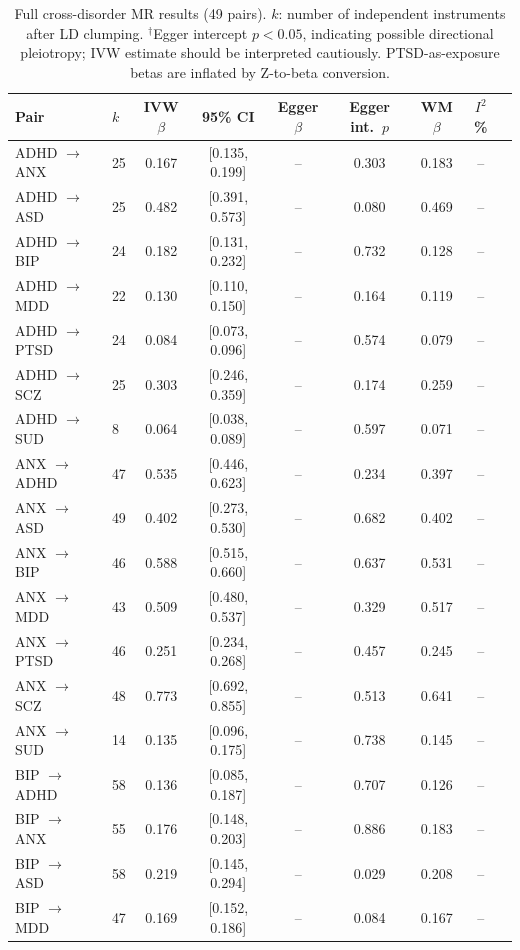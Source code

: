 \documentclass[11pt]{article}
\begin{document}
\begin{table}[h]
\centering
\caption{Full cross-disorder MR results (49 pairs). $k$: number of independent instruments after LD clumping. $^{\dagger}$Egger intercept $p < 0.05$, indicating possible directional pleiotropy; IVW estimate should be interpreted cautiously. PTSD-as-exposure betas are inflated by Z-to-beta conversion.}
\label{tab:mr_full}
\footnotesize
\begin{tabular}{llccccccc}
\toprule
Pair & $k$ & IVW $\beta$ & 95\% CI & Egger $\beta$ & Egger int.\ $p$ & WM $\beta$ & $I^2$\% \\
\midrule
ADHD $\to$ ANX & 25 & 0.167 & [0.135, 0.199] & -- & 0.303 & 0.183 & -- \\
ADHD $\to$ ASD & 25 & 0.482 & [0.391, 0.573] & -- & 0.080 & 0.469 & -- \\
ADHD $\to$ BIP & 24 & 0.182 & [0.131, 0.232] & -- & 0.732 & 0.128 & -- \\
ADHD $\to$ MDD & 22 & 0.130 & [0.110, 0.150] & -- & 0.164 & 0.119 & -- \\
ADHD $\to$ PTSD & 24 & 0.084 & [0.073, 0.096] & -- & 0.574 & 0.079 & -- \\
ADHD $\to$ SCZ & 25 & 0.303 & [0.246, 0.359] & -- & 0.174 & 0.259 & -- \\
ADHD $\to$ SUD & 8 & 0.064 & [0.038, 0.089] & -- & 0.597 & 0.071 & -- \\
\midrule
ANX $\to$ ADHD & 47 & 0.535 & [0.446, 0.623] & -- & 0.234 & 0.397 & -- \\
ANX $\to$ ASD & 49 & 0.402 & [0.273, 0.530] & -- & 0.682 & 0.402 & -- \\
ANX $\to$ BIP & 46 & 0.588 & [0.515, 0.660] & -- & 0.637 & 0.531 & -- \\
ANX $\to$ MDD & 43 & 0.509 & [0.480, 0.537] & -- & 0.329 & 0.517 & -- \\
ANX $\to$ PTSD & 46 & 0.251 & [0.234, 0.268] & -- & 0.457 & 0.245 & -- \\
ANX $\to$ SCZ & 48 & 0.773 & [0.692, 0.855] & -- & 0.513 & 0.641 & -- \\
ANX $\to$ SUD & 14 & 0.135 & [0.096, 0.175] & -- & 0.738 & 0.145 & -- \\
\midrule
BIP $\to$ ADHD & 58 & 0.136 & [0.085, 0.187] & -- & 0.707 & 0.126 & -- \\
BIP $\to$ ANX & 55 & 0.176 & [0.148, 0.203] & -- & 0.886 & 0.183 & -- \\
BIP $\to$ ASD & 58 & 0.219 & [0.145, 0.294] & -- & 0.029 & 0.208 & -- \\
BIP $\to$ MDD & 47 & 0.169 & [0.152, 0.186] & -- & 0.084 & 0.167 & -- \\

\end{tabular}
\end{table}
\end{document}
